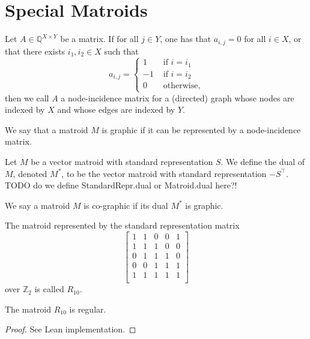 \chapter{Special Matroids}

\begin{definition}
    \label{Matrix.IsGraphic}
    \leanok
    Let $A \in \mathbb{Q}^{X \times Y}$ be a matrix. If for all $j \in Y$, one has that $a_{i,j} = 0$ for all $i \in X$, or that there exists $i_1,i_2 \in X$ such that
    \[
    a_{i,j} = \begin{cases}
        1 & \text{ if $i = i_1$} \\
        -1 & \text{ if $i = i_2$} \\
        0 & \text{ otherwise},
    \end{cases}
    \]
    then we call $A$ a node-incidence matrix for a (directed) graph whose nodes are indexed by $X$ and whose edges are indexed by $Y$.
\end{definition}

\begin{definition}
    \label{Matroid.IsGraphic}
    \leanok
    We say that a matroid $M$ is graphic if it can be represented by a node-incidence matrix.
\end{definition}

\begin{definition}
    \label{StandardRepr.dual}
    \leanok
    Let $M$ be a vector matroid with standard representation $S$. We define the dual of $M$, denoted $M^*$, to be the vector matroid with standard representation $-S^\intercal$.
    TODO do we define StandardRepr.dual or Matroid.dual here?!
\end{definition}

\begin{definition}
    \label{Matroid.IsCographic}
    \leanok
    We say a matroid $M$ is co-graphic if its dual $M^*$ is graphic.
\end{definition}

\begin{definition}
    \label{matroidR10}
    \leanok
    The matroid represented by the standard representation matrix
    \[\begin{bmatrix}
        1 & 1 & 0 & 0 & 1 \\
        1 & 1 & 1 & 0 & 0 \\
        0 & 1 & 1 & 1 & 0 \\
        0 & 0 & 1 & 1 & 1 \\
        1 & 1 & 1 & 1 & 1 \\
    \end{bmatrix}\]
    over $\mathbb{Z}_2$ is called $R_{10}.$
\end{definition}

\begin{lemma}
    \label{matroidR10.isRegular}
    \leanok
    The matroid $R_{10}$ is regular.
\end{lemma}

\begin{proof}
    See Lean implementation.
\end{proof}
